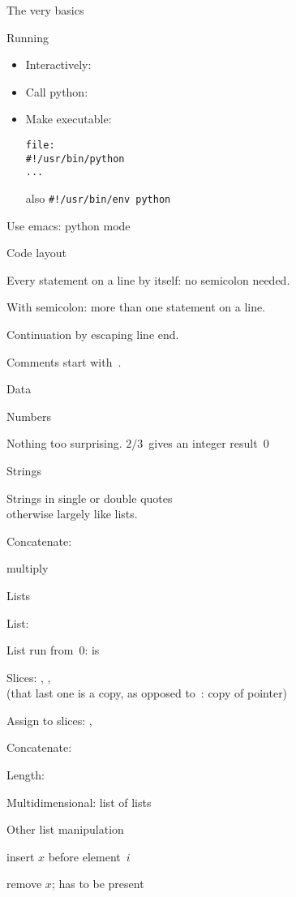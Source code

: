  {The very basics}

 {Running}

\begin{itemize}
\item Interactively: 
\item Call python: 
\item Make executable: 
\begin{verbatim}
file:
#!/usr/bin/python
...
\end{verbatim}
also \verb+#!/usr/bin/env python+
\end{itemize}

Use emacs: python mode

 {Code layout}

Every statement on a line by itself: no semicolon needed.

With semicolon: more than one statement on a line.

Continuation by escaping line end.

Comments start with~\n{\#}.

 {Data}

 {Numbers}

Nothing too surprising. $2/3$~gives an integer result~0

 {Strings}

Strings in single or double quotes\\
otherwise largely like lists.

Concatenate: 

multiply 

 {Lists}

List: 

List run from~0:  is \n{[2,'a']}

Slices: , , \\
(that last one is a copy, as opposed to~: copy of pointer)

Assign to slices: , 

Concatenate: 

Length: 

Multidimensional: list of lists 

 {Other list manipulation}

 insert $x$ before element~$i$

 remove $x$; has to be present

